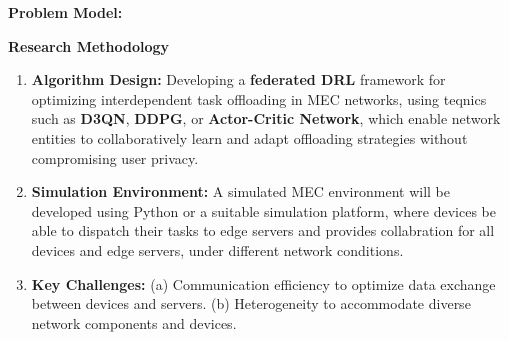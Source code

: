 \documentclass[12pt]{article}
\begin{document}
\vspace{3mm}

\noindent\textbf{\large Problem Model: } 
\noindent



\vspace{5mm}

\noindent\textbf{\large Research Methodology}

\begin{enumerate} \item \textbf{Algorithm Design:} Developing a  \textbf{federated DRL} framework for optimizing interdependent task offloading in MEC networks, using teqnics such as \textbf{D3QN},  \textbf{DDPG}, or  \textbf{Actor-Critic Network}, which enable network entities to collaboratively learn and adapt offloading strategies without compromising user privacy. \item \textbf{Simulation Environment:} A simulated MEC environment will be developed using Python or a suitable simulation platform, where devices be able to dispatch their tasks to edge servers and provides collabration for all devices and edge servers, under different network conditions. 
	
	
	\item \textbf{Key Challenges:} (a) Communication efficiency to optimize data exchange between devices and servers.  (b) Heterogeneity to accommodate diverse network components and devices.
\end{enumerate}







\end{document}
